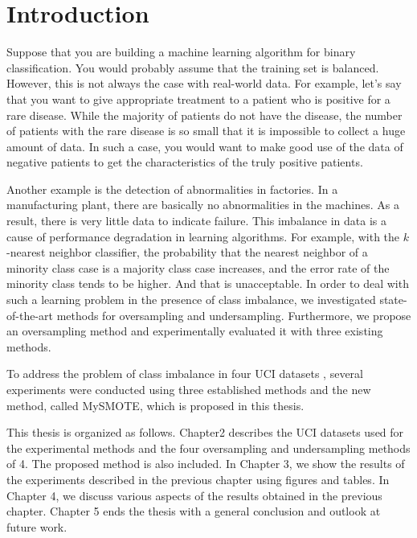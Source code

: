 \chapter{Introduction}

Suppose that you are building a machine learning algorithm for binary classification.
You would probably assume that the training set is balanced. However, this is not always the case with real-world data. For example, let's say that you want to give appropriate treatment to a patient who is positive for a rare disease. While the majority of patients do not have the disease, the number of patients with the rare disease is so small that it is impossible to collect a huge amount of data. In such a case, you would want to make good use of the data of negative patients to get the characteristics of the truly positive patients. 

Another example is the detection of abnormalities in factories. In a manufacturing plant, there are basically no abnormalities in the machines. As a result, there is very little data to indicate failure. This imbalance in data is a cause of performance degradation in learning algorithms. For example, with the $k$-nearest neighbor classifier, the probability that the nearest neighbor of a minority class case is a majority class case increases, and the error rate of the minority class tends to be higher. And that is unacceptable. In order to deal with such a learning problem in the presence of class imbalance, we investigated state-of-the-art methods for oversampling and undersampling. 
Furthermore, we propose an oversampling method and experimentally evaluated it with three existing methods.

To address the problem of class imbalance in four UCI datasets \cite{UCI}, several experiments were conducted using three established methods and the new method, called MySMOTE, which is proposed in this thesis.

This thesis is organized as follows. Chapter2 describes the UCI datasets \cite{UCI} used for the experimental methods and the four oversampling and undersampling methods of 4. The proposed method is also included. In Chapter 3, we show the results of the experiments described in the previous chapter using figures and tables. In Chapter 4, we discuss various aspects of the results obtained in the previous chapter. Chapter 5 ends the thesis with a general conclusion and outlook at future work.